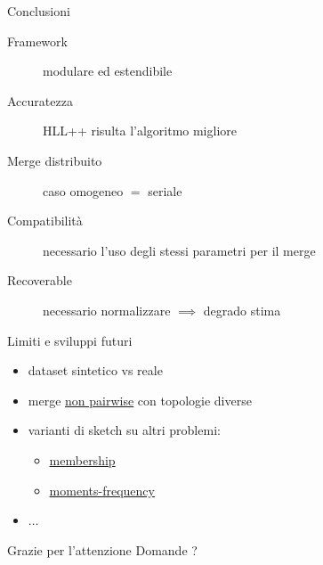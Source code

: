 \documentclass[aspectratio=169, 10pt]{beamer}
\begin{document}
  \begin{frame}{Conclusioni}
    \begin{description}
      \item[Framework] modulare ed estendibile
      \item[Accuratezza] HLL++ risulta l'algoritmo migliore
      \item[Merge distribuito] caso omogeneo $=$ seriale
      \item[Compatibilit\`a] necessario l'uso degli stessi parametri per il merge
      \item[Recoverable] necessario normalizzare $\implies$ degrado stima
    \end{description}
  \end{frame}

  \begin{frame}{Limiti e sviluppi futuri}
    \begin{itemize}
      \item dataset sintetico vs reale
      \item merge \underline{non pairwise} con topologie diverse
      \item varianti di sketch su altri problemi:
            \begin{itemize}
              \item \underline{membership}
              \item \underline{moments-frequency}
            \end{itemize}
      \item $\dots$
    \end{itemize}
  \end{frame}

  \begin{frame}[standout]{Grazie per l'attenzione}
    Domande ?
  \end{frame}
\end{document}
